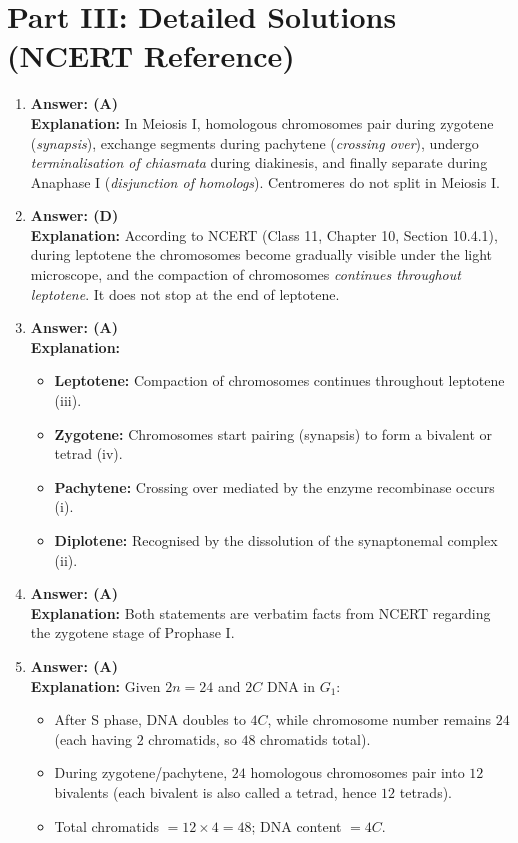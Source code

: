 \documentclass[11pt,a4paper]{article}
\begin{document}
\newpage
\section*{Part III: Detailed Solutions (NCERT Reference)}

\begin{enumerate}[label=\textbf{\arabic*.}]

\item \textbf{Answer: (A)}\\
\textbf{Explanation:} In Meiosis I, homologous chromosomes pair during zygotene (\textit{synapsis}), exchange segments during pachytene (\textit{crossing over}), undergo \textit{terminalisation of chiasmata} during diakinesis, and finally separate during Anaphase I (\textit{disjunction of homologs}). Centromeres do not split in Meiosis I.

\item \textbf{Answer: (D)}\\
\textbf{Explanation:} According to NCERT (Class 11, Chapter 10, Section 10.4.1), during leptotene the chromosomes become gradually visible under the light microscope, and the compaction of chromosomes \textit{continues throughout leptotene}. It does not stop at the end of leptotene.

\item \textbf{Answer: (A)}\\
\textbf{Explanation:}
\begin{itemize}
    \item \textbf{Leptotene:} Compaction of chromosomes continues throughout leptotene (iii).
    \item \textbf{Zygotene:} Chromosomes start pairing (synapsis) to form a bivalent or tetrad (iv).
    \item \textbf{Pachytene:} Crossing over mediated by the enzyme recombinase occurs (i).
    \item \textbf{Diplotene:} Recognised by the dissolution of the synaptonemal complex (ii).
\end{itemize}

\item \textbf{Answer: (A)}\\
\textbf{Explanation:} Both statements are verbatim facts from NCERT regarding the zygotene stage of Prophase I.

\item \textbf{Answer: (A)}\\
\textbf{Explanation:} Given $2n = 24$ and $2C$ DNA in $G_1$:
\begin{itemize}
    \item After S phase, DNA doubles to $4C$, while chromosome number remains $24$ (each having $2$ chromatids, so $48$ chromatids total).
    \item During zygotene/pachytene, $24$ homologous chromosomes pair into $12$ bivalents (each bivalent is also called a tetrad, hence $12$ tetrads).
    \item Total chromatids $= 12 \times 4 = 48$; DNA content $= 4C$.
\end{itemize}


\end{enumerate}
\end{document}
